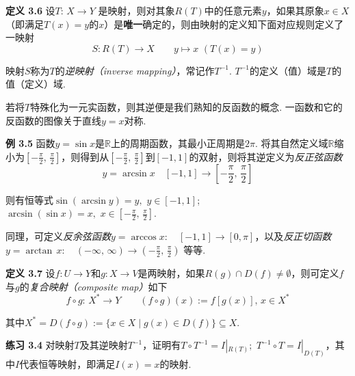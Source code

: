 \documentclass{article}
\begin{document}
\vspace{4pt}

\textbf{定义 3.6} 设$T:\,X\longrightarrow Y$ 是映射，则对其象$R(T)$中的任意元素$y$，如果其原象$x\in X$（即满足$T(x)=y$的$x$）是\textbf{唯一}确定的，则由映射的定义知下面对应规则定义了一映射\[S: R(T)\longrightarrow X\qquad y\longmapsto x\,\,(T(x)=y)\]

映射$S$称为$T$的\textit{逆映射（inverse mapping）}，常记作$T^{-1}$. $T^{-1}$的定义（值）域是$T$的值（定义）域. 

\vspace{3pt}

若将$T$特殊化为一元实函数，则其逆便是我们熟知的反函数的概念. 一函数和它的反函数的图像关于直线$y=x$对称. 

\vspace{3pt}

\textbf{例 3.5} 函数$y=\sin{x}$是$\mathbb{R}$上的周期函数，其最小正周期是$2\pi$. 将其自然定义域$\mathbb{R}$缩小为$\left[-\frac{\pi}{2},\,\frac{\pi}{2}\right]$，则得到从$\left[-\frac{\pi}{2},\,\frac{\pi}{2}\right]$到$[-1,1]$的双射，则将其逆定义为\textit{反正弦函数}\[y=\arcsin{x}\quad [-1,1]\longrightarrow \left[-\frac{\pi}{2},\,\frac{\pi}{2}\right]\]

则有恒等式$\sin{(\arcsin{y})}=y,\,\,y\in[-1,1]$;\,\,\,$\arcsin{(\sin{x})}=x,\,\,x\in\left[-\frac{\pi}{2},\,\frac{\pi}{2}\right]$.

\vspace{3pt}

同理，可定义\textit{反余弦函数}$y=\arccos{x}:\quad [-1,1]\longrightarrow[0,\pi]$，以及\textit{反正切函数} $y=\arctan\,x:\quad (-\infty,\,\infty)\longrightarrow \left(-\frac{\pi}{2},\,\frac{\pi}{2}\right)$ 等等.

\vspace{4pt}


\textbf{定义 3.7} 设$f: U\longrightarrow Y$和$g: X\longrightarrow V$是两映射，如果$R(g)\cap D(f)\neq \emptyset$，则可定义$f$与$g$的\textit{复合映射（composite map）}如下\[f\circ g:\,X^{*}\longrightarrow Y\qquad (f\circ g)(x):=f[g(x)],\,x\in X^{*}\]

其中$X^{*}=D(f\circ g):=\{x\in X\mid g(x)\in D(f)\}\subseteq X$. 

\vspace{3pt}


\textbf{练习 3.4} 对映射$T$及其逆映射$T^{-1}$，证明有$T\circ T^{-1}=I|_{R(T)};\,\, T^{-1}\circ T=I|_{D(T)}$，其中$I$代表恒等映射，即满足$I(x)=x$的映射. 

\vspace{3pt}
\end{document}
